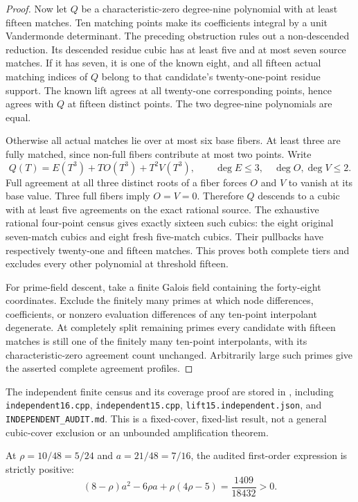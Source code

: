 \begin{proof}
Now let $Q$ be a characteristic-zero degree-nine polynomial with at least fifteen matches. Ten matching points make its coefficients integral by a unit Vandermonde determinant. The preceding obstruction rules out a non-descended reduction. Its descended residue cubic has at least five and at most seven source matches. If it has seven, it is one of the known eight, and all fifteen actual matching indices of $Q$ belong to that candidate's twenty-one-point residue support. The known lift agrees at all twenty-one corresponding points, hence agrees with $Q$ at fifteen distinct points. The two degree-nine polynomials are equal.

Otherwise all actual matches lie over at most six base fibers. At least three are fully matched, since non-full fibers contribute at most two points. Write
\[
 Q(T)=E(T^3)+T O(T^3)+T^2V(T^3),\qquad
 \deg E\le3,\quad\deg O,\deg V\le2.
\]
Full agreement at all three distinct roots of a fiber forces $O$ and $V$ to vanish at its base value. Three full fibers imply $O=V=0$. Therefore $Q$ descends to a cubic with at least five agreements on the exact rational source. The exhaustive rational four-point census gives exactly sixteen such cubics: the eight original seven-match cubics and eight fresh five-match cubics. Their pullbacks have respectively twenty-one and fifteen matches. This proves both complete tiers and excludes every other polynomial at threshold fifteen.

For prime-field descent, take a finite Galois field containing the forty-eight coordinates. Exclude the finitely many primes at which node differences, coefficients, or nonzero evaluation differences of any ten-point interpolant degenerate. At completely split remaining primes every candidate with fifteen matches is still one of the finitely many ten-point interpolants, with its characteristic-zero agreement count unchanged. Arbitrarily large such primes give the asserted complete agreement profiles.
\end{proof}

The independent finite census and its coverage proof are stored in
,
including \texttt{independent16.cpp}, \texttt{independent15.cpp},
\texttt{lift15.independent.json}, and
\texttt{INDEPENDENT\_AUDIT.md}. This is a fixed-cover, fixed-list result, not a general cubic-cover exclusion or an unbounded amplification theorem.

At $\rho=10/48=5/24$ and $a=21/48=7/16$, the audited first-order expression is strictly positive:
\[
 (8-\rho)a^2-6\rho a+\rho(4\rho-5)=\frac{1409}{18432}>0.
\]
